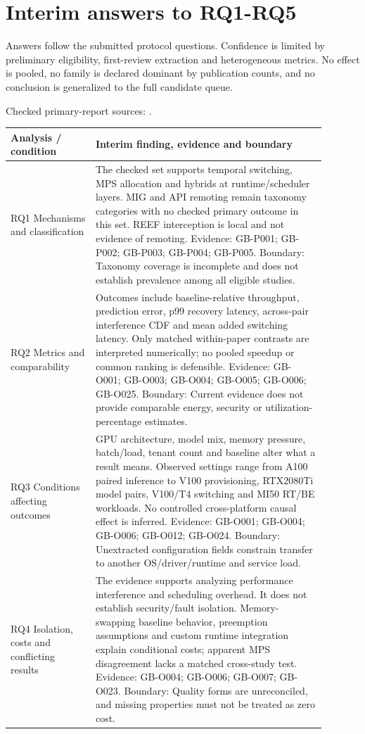 \documentclass[12pt,a4paper]{article}
\begin{document}
\section{Interim answers to RQ1-RQ5}
Answers follow the submitted protocol questions. Confidence is limited by preliminary eligibility, first-review extraction and heterogeneous metrics. No effect is pooled, no family is declared dominant by publication counts, and no conclusion is generalized to the full candidate queue.


Checked primary-report sources: \cite{vastpipe,igniter,gpulets,pipeswitch,reef}. 
\begin{longtable}{p{0.24\linewidth}p{0.65\linewidth}}
\toprule
Analysis /\allowbreak{} condition & Interim finding, evidence and boundary\\\midrule
\endhead
RQ1 Mechanisms and classification & The checked set supports temporal switching, MPS allocation and hybrids at runtime/\allowbreak{}scheduler layers. MIG and API remoting remain taxonomy categories with no checked primary outcome in this set. REEF interception is local and not evidence of remoting. Evidence: GB-P001; GB-P002; GB-P003; GB-P004; GB-P005. Boundary: Taxonomy coverage is incomplete and does not establish prevalence among all eligible studies.\\
RQ2 Metrics and comparability & Outcomes include baseline-relative throughput, prediction error, p99 recovery latency, across-pair interference CDF and mean added switching latency. Only matched within-paper contrasts are interpreted numerically; no pooled speedup or common ranking is defensible. Evidence: GB-O001; GB-O003; GB-O004; GB-O005; GB-O006; GB-O025. Boundary: Current evidence does not provide comparable energy, security or utilization-percentage estimates.\\
RQ3 Conditions affecting outcomes & GPU architecture, model mix, memory pressure, batch/\allowbreak{}load, tenant count and baseline alter what a result means. Observed settings range from A100 paired inference to V100 provisioning, RTX2080Ti model pairs, V100/\allowbreak{}T4 switching and MI50 RT/\allowbreak{}BE workloads. No controlled cross-platform causal effect is inferred. Evidence: GB-O001; GB-O004; GB-O006; GB-O012; GB-O024. Boundary: Unextracted configuration fields constrain transfer to another OS/\allowbreak{}driver/\allowbreak{}runtime and service load.\\
RQ4 Isolation, costs and conflicting results & The evidence supports analyzing performance interference and scheduling overhead. It does not establish security/\allowbreak{}fault isolation. Memory-swapping baseline behavior, preemption assumptions and custom runtime integration explain conditional costs; apparent MPS disagreement lacks a matched cross-study test. Evidence: GB-O004; GB-O006; GB-O007; GB-O023. Boundary: Quality forms are unreconciled, and missing properties must not be treated as zero cost.\\

\end{longtable}
\end{document}
